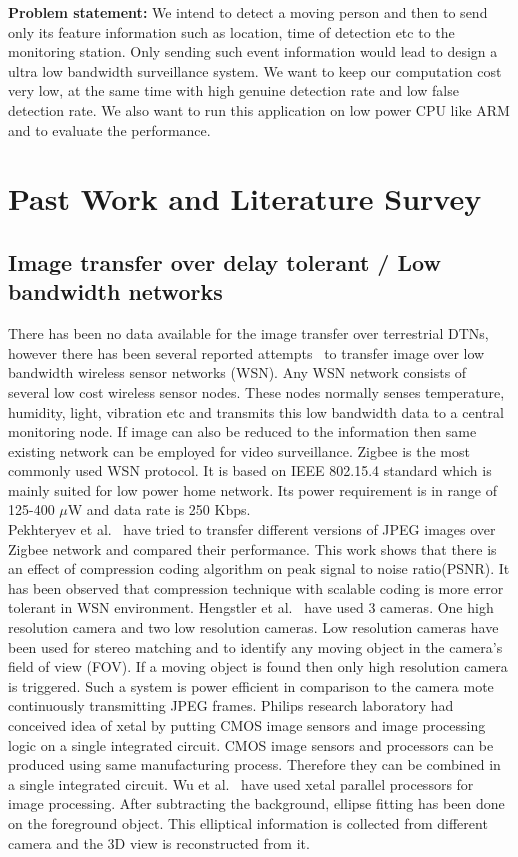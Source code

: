 \indent \textbf{Problem statement:} We intend to detect a moving person
and then to send only its feature information such as location, time of
detection etc to the monitoring station. Only sending such event
information would lead to design a ultra low bandwidth surveillance
system. We want to keep our computation cost very low, at the same time
with high genuine detection rate and low false detection rate. We also
want to run this application on low power CPU like ARM and to evaluate
the performance.
\section{Past Work and Literature Survey}
\subsection{Image transfer over delay tolerant / Low bandwidth networks}
\indent There has been no data available for the image transfer over
terrestrial DTNs, however there has been several reported attempts~\cite{2, 3,
4, 5} to transfer image over low bandwidth wireless sensor networks
(WSN). Any WSN network consists of several low cost wireless sensor
nodes. These nodes normally senses temperature, humidity, light,
vibration etc and transmits this low bandwidth data to a central
monitoring node. If image can also be reduced to the information then
same existing network can be employed for video surveillance.
Zigbee is the most commonly used WSN protocol. It is based on
IEEE 802.15.4 standard which is mainly suited for low power home
network. Its power requirement is in range of 125-400 $\mu$W and data
rate is 250 Kbps.\\
\indent Pekhteryev et al.~\cite{2} have tried to transfer different
versions of JPEG images over Zigbee network and compared their
performance. This work shows that there is an effect of compression
coding algorithm on peak signal to noise ratio(PSNR). It has been
observed that compression technique with scalable coding is more error
tolerant in WSN environment. Hengstler et al.~\cite{3, 5} have used 3
cameras. One high resolution camera and two low resolution cameras. Low
resolution cameras have been used for stereo matching and to identify
any moving object in the camera's field of view (FOV). If a moving
object is found then only high resolution camera is triggered. Such a
system is power efficient in comparison to the camera mote continuously
transmitting JPEG frames. Philips research laboratory had conceived idea
of xetal by putting CMOS image sensors and image processing logic on a
single integrated circuit. CMOS image sensors and processors can be
produced using same manufacturing process. Therefore they can be
combined in a single integrated circuit. Wu et al.~\cite{4} have used
xetal parallel processors for image processing. After subtracting the
background, ellipse fitting has been done on the foreground object. This
elliptical information is collected from different camera and the 3D
view is reconstructed from it.


